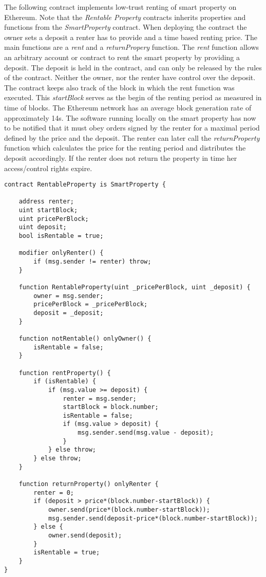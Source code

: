 The following contract implements low-trust renting of smart property on Ethereum. Note that the \emph{Rentable Property} contracts inherits properties and functions from the \emph{SmartProperty} contract. When deploying the contract the owner sets a deposit a renter has to provide and a time based renting price. The main functions are a \emph{rent} and a \emph{returnPropery} function. The \emph{rent} function allows an arbitrary account or contract to rent the smart property by providing a deposit. The deposit is held in the contract, and can only be released by the rules of the contract. Neither the owner, nor the renter have control over the deposit. The contract keeps also track of the block in which the rent function was executed. This \emph{startBlock} serves as the begin of the renting period as measured in time of blocks. The Ethereum network has an average block generation rate of approximately 14s. 
The software running locally on the smart property has now to be notified that it must obey orders signed by the renter for a maximal period defined by the price and the deposit. 
The renter can later call the \emph{returnProperty} function which calculates the price for the renting period and distributes the deposit accordingly. If the renter does not return the property in time her access/control rights expire. 

\begin{lstlisting}[breaklines,basicstyle=\tiny]
contract RentableProperty is SmartProperty {
    
    address renter;
    uint startBlock;
    uint pricePerBlock;
    uint deposit;
    bool isRentable = true;
    
    modifier onlyRenter() {
        if (msg.sender != renter) throw;
    } 
    
    function RentableProperty(uint _pricePerBlock, uint _deposit) {
    	owner = msg.sender;
        pricePerBlock = _pricePerBlock;
        deposit = _deposit;
    }
    
    function notRentable() onlyOwner() {
        isRentable = false;
    }
    
    function rentProperty() {
        if (isRentable) {
            if (msg.value >= deposit) {
                renter = msg.sender;
                startBlock = block.number;
                isRentable = false;
                if (msg.value > deposit) {
                    msg.sender.send(msg.value - deposit);
                }
            } else throw;
        } else throw;
    }
    
    function returnProperty() onlyRenter {
        renter = 0;
        if (deposit > price*(block.number-startBlock)) {
            owner.send(price*(block.number-startBlock));
            msg.sender.send(deposit-price*(block.number-startBlock));
        } else {
            owner.send(deposit);
        }
        isRentable = true;
    }
}
\end{lstlisting}

